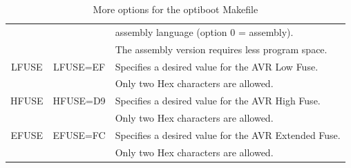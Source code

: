 \begin{table}[H]
\begin{center}
\begin{tabular}{| c | c | l |}
                   &                & assembly language (option 0 = assembly).\\
                   &                & The assembly version requires less program space. \\
    \hline
   LFUSE           & LFUSE=EF       & Specifies a desired value for the AVR Low Fuse.\\
	           &                & Only two Hex characters are allowed.\\
    \hline
   HFUSE           & HFUSE=D9       & Specifies a desired value for the AVR High Fuse.\\
	           &                & Only two Hex characters are allowed.\\
    \hline
   EFUSE           & EFUSE=FC       & Specifies a desired value for the AVR Extended Fuse.\\
	           &                & Only two Hex characters are allowed.\\
    \hline
    \end{tabular}
  \end{center}
  \caption{More options for the optiboot Makefile}
  \label{tab:options2}
\end{table}


